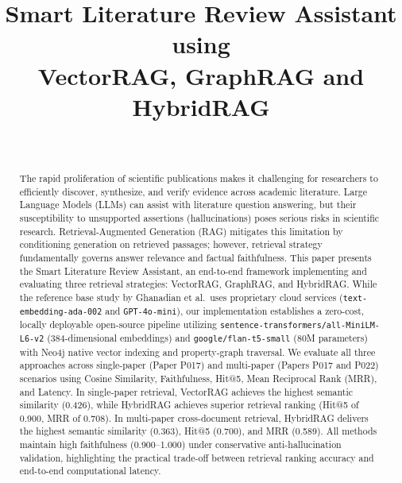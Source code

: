 \documentclass[conference]{IEEEtran}
\begin{document}
\title{Smart Literature Review Assistant using\\
VectorRAG, GraphRAG and HybridRAG}

\author{
\\[1em]
}

\maketitle

\begin{abstract}
The rapid proliferation of scientific publications makes it challenging for researchers to efficiently discover, synthesize, and verify evidence across academic literature. Large Language Models (LLMs) can assist with literature question answering, but their susceptibility to unsupported assertions (hallucinations) poses serious risks in scientific research. Retrieval-Augmented Generation (RAG) mitigates this limitation by conditioning generation on retrieved passages; however, retrieval strategy fundamentally governs answer relevance and factual faithfulness. This paper presents the Smart Literature Review Assistant, an end-to-end framework implementing and evaluating three retrieval strategies: VectorRAG, GraphRAG, and HybridRAG. While the reference base study by Ghanadian et al.\ uses proprietary cloud services (\texttt{text-embedding-ada-002} and \texttt{GPT-4o-mini}), our implementation establishes a zero-cost, locally deployable open-source pipeline utilizing \texttt{sentence-transformers/all-MiniLM-L6-v2} (384-dimensional embeddings) and \texttt{google/flan-t5-small} (80M parameters) with Neo4j native vector indexing and property-graph traversal. We evaluate all three approaches across single-paper (Paper P017) and multi-paper (Papers P017 and P022) scenarios using Cosine Similarity, Faithfulness, Hit@5, Mean Reciprocal Rank (MRR), and Latency. In single-paper retrieval, VectorRAG achieves the highest semantic similarity (0.426), while HybridRAG achieves superior retrieval ranking (Hit@5 of 0.900, MRR of 0.708). In multi-paper cross-document retrieval, HybridRAG delivers the highest semantic similarity (0.363), Hit@5 (0.700), and MRR (0.589). All methods maintain high faithfulness (0.900--1.000) under conservative anti-hallucination validation, highlighting the practical trade-off between retrieval ranking accuracy and end-to-end computational latency.
\end{abstract}
\end{document}
